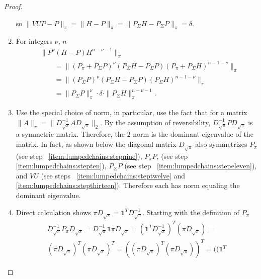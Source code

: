 \documentclass[12pt]{article}
\begin{document}
\begin{proof}
\begin{enumerate}
            so \( \| VUP - P \|_{\pi} = \| H - P \|_{\pi} = \|P_{\Sigma}H
            - P_{\Sigma}P\|_{\pi} = \delta \).
        \item
            For integers \( \nu \), \( n \)
            \begin{align*}
                & \| P^\nu(H-P)H^{n-\nu-1} \|_{\pi} \\
                & \qquad = \|(P_{\pi}+P_{\Sigma}P)^\nu(P_{\Sigma}H-P_{\Sigma}P)
                (P_{\pi}+P_{\Sigma}H)^{n-1-\nu}\|_{\pi} \\
                & \qquad = \|(P_{\Sigma}P)^\nu(P_{\Sigma}H-P_{\Sigma}P)
                (P_ {\Sigma}H)^{n-1-\nu}\|_{\pi} \\
                & \qquad = \| P_{\Sigma} P \|_{\pi}^\nu \cdot \delta
                \cdot \|P_{\Sigma}H\|_ {\pi}^{n-\nu-1}.
            \end{align*}
        \item
            Use the special choice of norm, in particular, use the fact
            that for a matrix \( \| A \|_{\pi} = \| D_{\sqrt{\pi}}^{-1}
            A D_{\sqrt{\pi}} \|_{2} \).  By the assumption of
            reversibility, \( D_{\sqrt{\pi}}^{-1} P D_{\sqrt{\pi}} \) is
            a symmetric matrix.  Therefore, the \( 2 \)-norm is the
            dominant eigenvalue of the matrix.  In fact, as shown below
            the diagonal matrix \( D_{\sqrt{\pi}} \) also symmetrizes \(
            P_{\pi} \) (see step~%
            \ref{item:lumpedchains:stepnine}), \( P_{\pi}P \), (see
            step~%
            \ref{item:lumpedchains:stepten}), \( P_{\Sigma}P \) (see
            step~%
            \ref{item:lumpedchains:stepeleven}), and \( VU \) (see
            steps~%
            \ref{item:lumpedchains:steptwelve} and~%
            \ref{item:lumpedchains:stepthirteen}). Therefore each has
            norm equaling the dominant eigenvalue.
        \item
            \label{item:lumpedchains:stepnine} Direct calculation shows \(
            \pi D_{\sqrt{\pi}} = \mathbf{1}^T D_{\sqrt{\pi}}^{-1} \).
            Starting with the definition of \( P_{\pi} \)
            \begin{multline*}
                D_{\sqrt{\pi}}^{-1} P_{\pi} D_{\sqrt{\pi}} = D_{\sqrt{\pi}}^
                {-1}\mathbf{1} \pi D_{\sqrt{\pi}} = (\mathbf{1}^T D_{\sqrt
                {\pi}}^{-1})^T(\pi D_{\sqrt{\pi}}) = \\
                (\pi D_{\sqrt{\pi}})^T(\pi D_{\sqrt{\pi}})^T = ( (\pi D_
                {\sqrt{\pi}})^T(\pi D_{\sqrt{\pi}}))^T = ( (\mathbf{1}^T

\end{multline*}
\end{enumerate}
\end{proof}
\end{document}
